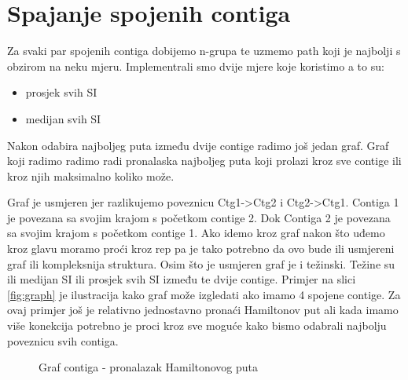 \section{Spajanje spojenih contiga}
Za svaki par spojenih contiga dobijemo n-grupa te uzmemo path koji je najbolji s obzirom na neku mjeru. Implementrali smo dvije mjere koje koristimo a to su: 
\begin{itemize}
    \item prosjek svih SI
    \item medijan svih SI
\end{itemize}


Nakon odabira najboljeg puta između dvije contige  radimo još jedan graf. Graf koji radimo radimo radi pronalaska najboljeg puta koji prolazi kroz sve contige ili kroz njih maksimalno koliko može.


Graf je usmjeren jer razlikujemo poveznicu Ctg1->Ctg2 i Ctg2->Ctg1. Contiga 1 je povezana sa svojim krajom s početkom contige 2. Dok Contiga 2 je povezana sa svojim krajom s početkom contige 1. Ako idemo kroz graf nakon što uđemo kroz glavu moramo proći kroz rep pa je tako potrebno da ovo bude ili usmjereni graf ili kompleksnija struktura. Osim što je usmjeren graf je i težinski. Težine su ili medijan SI ili prosjek svih SI između te dvije contige. Primjer na slici \ref{fig:graph} je ilustracija kako graf može izgledati ako imamo 4 spojene contige. Za ovaj primjer još je relativno jednostavno pronaći Hamiltonov put ali kada imamo više konekcija potrebno je proci kroz sve moguće kako bismo odabrali najbolju poveznicu svih contiga.


\begin{figure}[H]
\centering
{}
\caption{Graf contiga - pronalazak Hamiltonovog puta}
\label{fig:contigs}
\end{figure}


